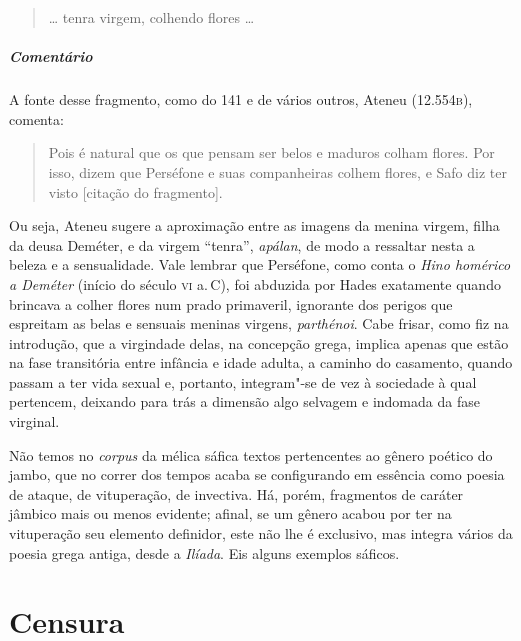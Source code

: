 \begin{verse}
\ldots{} tenra virgem, colhendo flores \ldots{}
\end{verse}

\medskip

\paragraph{Comentário} A fonte desse fragmento, como do 141 e de vários outros, Ateneu (12.554\textsc{b}), comenta: 

\begin{quote}
Pois é natural
que os que pensam ser belos e maduros colham flores. Por isso, dizem que
Perséfone e suas companheiras colhem flores, e Safo diz ter visto 
[citação do fragmento].
\end{quote}

 Ou seja, Ateneu sugere a aproximação entre as imagens
 da menina virgem, filha da deusa Deméter, e da virgem ``tenra'', \emph{apálan}, de modo a ressaltar nesta a beleza e a
 sensualidade. Vale lembrar que Perséfone, como conta o \emph{Hino homérico a Deméter} 
 (início do século \textsc{vi} a.\,C), foi abduzida por Hades exatamente
 quando brincava a colher flores num prado primaveril, ignorante dos perigos que
 espreitam as belas e sensuais meninas virgens, \emph{parthénoi}. Cabe frisar, como fiz na introdução, que a virgindade delas,
 na concepção grega, implica
 apenas que estão na fase transitória entre infância e idade
 adulta, a caminho do casamento, quando passam a ter vida sexual e, portanto, integram"-se
 de vez à sociedade à qual pertencem, deixando para trás a dimensão algo
 selvagem e indomada da fase virginal.

\begin{argumento}
Não temos no \emph{corpus} da mélica sáfica textos pertencentes ao gênero
poético do jambo, que no correr dos tempos acaba se configurando em essência como poesia de
ataque, de vituperação, de invectiva. Há, porém,
fragmentos de caráter jâmbico mais ou menos evidente; afinal, se um gênero
acabou por ter na vituperação seu elemento definidor, este não lhe é exclusivo,
mas integra vários da poesia grega antiga, desde a \emph{Ilíada}. Eis
alguns exemplos sáficos.
\end{argumento}

\chapter{Censura}


